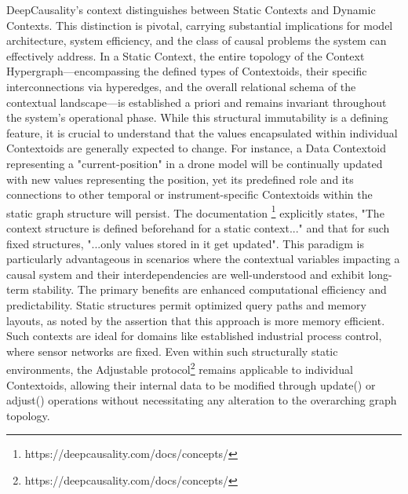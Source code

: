 DeepCausality's context distinguishes between Static Contexts and Dynamic Contexts. This distinction is pivotal, carrying substantial implications for model architecture, system efficiency, and the class of causal problems the system can effectively address.
In a Static Context, the entire topology of the Context Hypergraph—encompassing the defined types of Contextoids, their specific interconnections via hyperedges, and the overall relational schema of the contextual landscape—is established a priori and remains invariant throughout the system's operational phase. While this structural immutability is a defining feature, it is crucial to understand that the values encapsulated within individual Contextoids are generally expected to change. For instance, a Data Contextoid representing a "current-position" in a drone model will be continually updated with new values representing the position, yet its predefined role and its connections to other temporal or instrument-specific Contextoids within the static graph structure will persist. The documentation \footnote{https://deepcausality.com/docs/concepts/} explicitly states, "The context structure is defined beforehand for a static context..." and that for such fixed structures, "...only values stored in it get updated". This paradigm is particularly advantageous in scenarios where the contextual variables impacting a causal system and their interdependencies are well-understood and exhibit long-term stability. The primary benefits are enhanced computational efficiency and predictability. Static structures permit optimized query paths and memory layouts, as noted by the assertion that this approach is more memory efficient. Such contexts are ideal for domains like established industrial process control, where sensor networks are fixed. Even within such structurally static environments, the Adjustable protocol\footnote{https://deepcausality.com/docs/concepts/} remains applicable to individual Contextoids, allowing their internal data to be modified through update() or adjust() operations without necessitating any alteration to the overarching graph topology.

